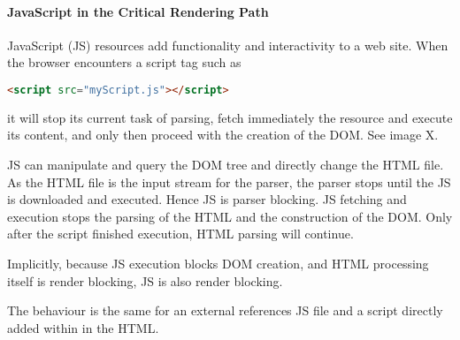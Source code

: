 


\paragraph{JavaScript in the Critical Rendering Path}



JavaScript (JS) resources add functionality and interactivity to a web site.
When the browser encounters a script tag such as

\begin{lstlisting}[language=html, numbers=none]
<script src="myScript.js"></script>
\end{lstlisting}

it will stop its current task of parsing, fetch immediately the resource and execute its content, and only then proceed with the creation of the DOM. %
See image X.

JS can manipulate and query the DOM tree and directly change the HTML file.
As the HTML file is the input stream for the parser,  the parser stops until the JS is downloaded and executed. %
Hence JS is parser blocking.
JS fetching and execution stops the parsing of the HTML and the construction of the DOM.
Only after the script finished execution, HTML parsing will continue.

Implicitly, because JS execution blocks DOM creation, and HTML processing itself is render blocking, JS is also render blocking. %


The behaviour is the same for an external references JS file and a script directly added within in the HTML.





